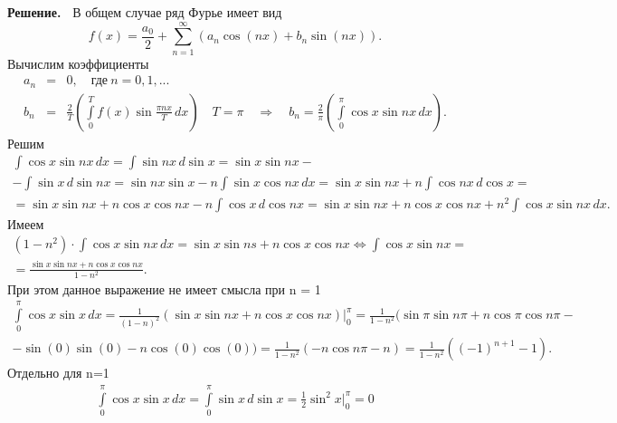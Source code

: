 \documentclass[12pt]{article}
\begin{document}
{\bf Решение.~}	
\noindent
В общем случае ряд Фурье имеет вид
$$
f(x)=\frac{a_0}{2}+\sum_{n=1}^\infty 
\left(a_n\cos{(nx)}+b_n\sin{(nx)}\right).
$$
\noindent
Вычислим коэффициенты
$$
\begin{array}{rcl}
	a_n &=& 0,\quad\text{где}\ n = 0,1,...											\\[12pt]
	b_n &=& \displaystyle\frac{2}{T}\left(
	\int\limits_0^T
	f(x) \sin \frac{\pi nx}{T}\,dx \right) \quad T=\pi \quad \Rightarrow \quad b_n = \displaystyle\frac{2}{\pi}\left(
	\int\limits_0^\pi
	\cos{x} \sin{nx} \,dx \right).
\end{array}
$$
\noindent
Решим
$$
\begin{array}{lrc}
\displaystyle \int \cos{x} \sin{nx} \,dx = \displaystyle \int \sin{nx} \,d\sin{x} = \displaystyle \sin{x}\sin{nx} - \\[12pt] - \int \sin{x} \,d\sin{nx} = \displaystyle \sin{nx}\sin{x} - n\int \sin{x}\cos{nx} \,dx 
 = \displaystyle \sin{x}\sin{nx} + n\int \cos{nx} \,d\cos{x} = \\[12pt] = \displaystyle \sin{x}\sin{nx} +  n\cos{x}\cos{nx} - n\int \cos{x} \,d\cos{nx} = \displaystyle \sin{x}\sin{nx} + n\cos{x}\cos{nx} + n^2\int \cos{x}\sin{nx} \,dx. 
\end{array}
$$
\noindent
Имеем
$$
\begin{array}{lrc}
	\displaystyle (1-n^2)\cdot\int \cos{x} \sin{nx} \,dx = \displaystyle \sin{x}\sin{ns} + n\cos{x}\cos{nx} \Leftrightarrow  \displaystyle \int \cos{x}\sin{nx} = \\[12pt] = \displaystyle \frac{\sin{x}\sin{nx}+n\cos{x}\cos{nx}}{1-n^2}.
\end{array}
$$
\noindent
При этом данное выражение не имеет смысла при n = 1
$$
\begin{array}{lrc}
	\displaystyle \int\limits_0^\pi \cos{x}\sin{x} \,dx = \displaystyle \frac{1}{(1-n)^{2}}\left(\sin{x}\sin{nx} + n\cos{x}\cos{nx}\right)\bigg|_0^\pi = \displaystyle \frac{1}{1-n^2}(\sin{\pi}\sin{n\pi} + n\cos{\pi}\cos{n\pi} -
	\\[12pt] -\sin(0)\sin(0) - n\cos(0)\cos(0) ) = \displaystyle \frac{1}{1-n^2}\left(- n\cos{n\pi}- n  \right) = \displaystyle \frac{1}{1-n^2}\left((-1)^{n+1} -1 \right) . 
\end{array}
$$
\noindent
Отдельно для n=1
$$
\begin{array}{lrc}
	 \displaystyle \int\limits_0^\pi \cos{x}\sin{x} \,dx = \displaystyle \int\limits_0^\pi \sin{x} \,d\sin{x} = \displaystyle \frac{1}{2}\sin^2{x} \bigg|_0^\pi = 0
\end{array}
$$ 
\end{document}
